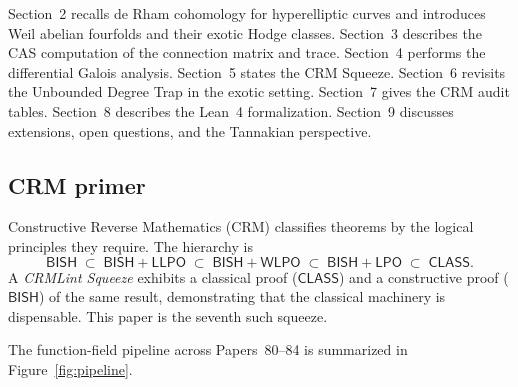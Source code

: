 \documentclass[11pt]{article}
\theoremstyle{plain}
\theoremstyle{definition}
\theoremstyle{remark}
\newcommand{\BISH}{\ensuremath{\mathsf{BISH}}}
\newcommand{\LPO}{\ensuremath{\mathsf{LPO}}}
\newcommand{\WLPO}{\ensuremath{\mathsf{WLPO}}}
\newcommand{\LLPO}{\ensuremath{\mathsf{LLPO}}}
\newcommand{\CLASS}{\ensuremath{\mathsf{CLASS}}}
\begin{document}
Section~2 recalls de Rham cohomology for hyperelliptic curves and introduces
Weil abelian fourfolds and their exotic Hodge classes.
Section~3 describes the CAS computation of the connection matrix and trace.
Section~4 performs the differential Galois analysis.
Section~5 states the CRM Squeeze.
Section~6 revisits the Unbounded Degree Trap in the exotic setting.
Section~7 gives the CRM audit tables.
Section~8 describes the Lean~4 formalization.
Section~9 discusses extensions, open questions, and the Tannakian perspective.

\subsection{CRM primer}

Constructive Reverse Mathematics (CRM) classifies theorems by the logical
principles they require. The hierarchy is
\[
\BISH \;\subset\; \BISH{+}\LLPO \;\subset\; \BISH{+}\WLPO
\;\subset\; \BISH{+}\LPO \;\subset\; \CLASS.
\]
A \emph{CRMLint Squeeze} exhibits a classical proof (\CLASS) and a
constructive proof (\BISH) of the same result, demonstrating that the
classical machinery is dispensable. This paper is the seventh such squeeze.

\medskip

The function-field pipeline across Papers~80--84 is summarized in Figure~\ref{fig:pipeline}.
\end{document}
